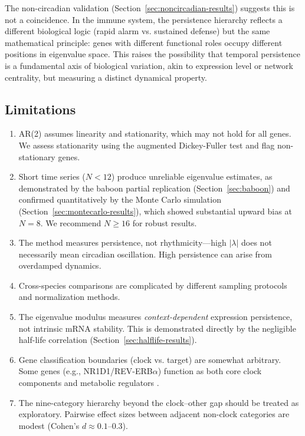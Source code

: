 \documentclass[11pt,letterpaper]{article}
\begin{document}
The non-circadian validation (Section~\ref{sec:noncircadian-results}) suggests this is not a coincidence. In the immune system, the persistence hierarchy reflects a different biological logic (rapid alarm vs. sustained defense) but the same mathematical principle: genes with different functional roles occupy different positions in eigenvalue space. This raises the possibility that temporal persistence is a fundamental axis of biological variation, akin to expression level or network centrality, but measuring a distinct dynamical property.

\subsection{Limitations}

\begin{enumerate}
\item AR(2) assumes linearity and stationarity, which may not hold for all genes. We assess stationarity using the augmented Dickey-Fuller test and flag non-stationary genes.

\item Short time series ($N < 12$) produce unreliable eigenvalue estimates, as demonstrated by the baboon partial replication (Section~\ref{sec:baboon}) and confirmed quantitatively by the Monte Carlo simulation (Section~\ref{sec:montecarlo-results}), which showed substantial upward bias at $N = 8$. We recommend $N \geq 16$ for robust results.

\item The method measures persistence, not rhythmicity---high $|\lambda|$ does not necessarily mean circadian oscillation. High persistence can arise from overdamped dynamics.

\item Cross-species comparisons are complicated by different sampling protocols and normalization methods.

\item The eigenvalue modulus measures \textit{context-dependent} expression persistence, not intrinsic mRNA stability. This is demonstrated directly by the negligible half-life correlation (Section~\ref{sec:halflife-results}).

\item Gene classification boundaries (clock vs. target) are somewhat arbitrary. Some genes (e.g., NR1D1/REV-ERB$\alpha$) function as both core clock components and metabolic regulators \citep{cho2012regulation}.

\item The nine-category hierarchy beyond the clock--other gap should be treated as exploratory. Pairwise effect sizes between adjacent non-clock categories are modest (Cohen's $d \approx 0.1$--$0.3$).


\end{enumerate}
\end{document}
